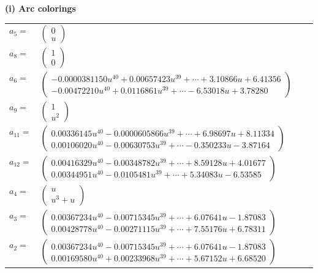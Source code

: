 \documentclass[1p]{elsarticle_modified}
\theoremstyle{definition}
\begin{document}
\flushleft \textbf{(i) Arc colorings}\\
\begin{tabular}{m{7pt} m{180pt} m{7pt} m{180pt} }
\flushright $a_{5}=$&$\begin{pmatrix}0\\u\end{pmatrix}$ \\
\flushright $a_{8}=$&$\begin{pmatrix}1\\0\end{pmatrix}$ \\
\flushright $a_{6}=$&$\begin{pmatrix}-0.0000381150 u^{40}+0.00657423 u^{39}+\cdots+3.10866 u+6.41356\\-0.00472210 u^{40}+0.0116861 u^{39}+\cdots-6.53018 u+3.78280\end{pmatrix}$ \\
\flushright $a_{9}=$&$\begin{pmatrix}1\\u^2\end{pmatrix}$ \\
\flushright $a_{11}=$&$\begin{pmatrix}0.00336145 u^{40}-0.0000605866 u^{39}+\cdots+6.98697 u+8.11334\\0.00106020 u^{40}-0.00630753 u^{39}+\cdots-0.350233 u-3.87164\end{pmatrix}$ \\
\flushright $a_{12}=$&$\begin{pmatrix}0.00416329 u^{40}-0.00348782 u^{39}+\cdots+8.59128 u+4.01677\\0.00344951 u^{40}-0.0105481 u^{39}+\cdots+5.34083 u-6.53585\end{pmatrix}$ \\
\flushright $a_{4}=$&$\begin{pmatrix}u\\u^3+u\end{pmatrix}$ \\
\flushright $a_{3}=$&$\begin{pmatrix}0.00367234 u^{40}-0.00715345 u^{39}+\cdots+6.07641 u-1.87083\\0.00428778 u^{40}-0.00271115 u^{39}+\cdots+7.55176 u+6.78311\end{pmatrix}$ \\
\flushright $a_{2}=$&$\begin{pmatrix}0.00367234 u^{40}-0.00715345 u^{39}+\cdots+6.07641 u-1.87083\\0.00169580 u^{40}+0.00233968 u^{39}+\cdots+5.67152 u+6.68520\end{pmatrix}$ \\

\end{tabular}
\end{document}
